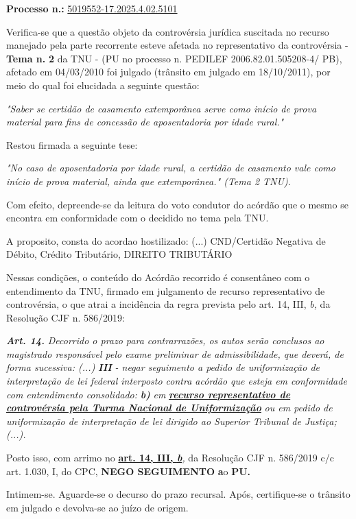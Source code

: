 \documentclass[12pt]{article}
\begin{document}
\justifying
\noindent \textbf{Processo n.: }\uline{5019552-17.2025.4.02.5101}

\noindent Verifica-se que a questão objeto da controvérsia jurídica suscitada no recurso manejado pela parte recorrente esteve afetada no representativo da controvérsia - \textbf{Tema n. }\textbf{2} da TNU - (PU no processo n. PEDILEF 2006.82.01.505208-4/ PB),  afetado em 04/03/2010 foi julgado (trânsito em julgado em 18/10/2011), por meio do qual foi elucidada a seguinte questão:

{\leftskip=3.1cm\rightskip=0.8cm\parindent=0pt \textit{"Saber se certidão de casamento extemporânea serve como início de prova material para fins de concessão de aposentadoria por idade rural."}\par}

\noindent Restou firmada a seguinte tese:

{\leftskip=3.1cm\rightskip=0.8cm\parindent=0pt \textit{"No caso de aposentadoria por idade rural, a certidão de casamento vale como início de prova material, ainda que extemporânea." (Tema 2 TNU).}\par}

\noindent Com efeito, depreende-se da leitura do voto condutor do acórdão que o mesmo se encontra em conformidade com o decidido no  tema pela TNU.

\noindent A proposito, consta do acordao hostilizado: (...) CND/Certidão Negativa de Débito, Crédito Tributário, DIREITO TRIBUTÁRIO

\noindent Nessas condições, o conteúdo do Acórdão recorrido é consentâneo com o entendimento da TNU, firmado em julgamento de recurso representativo de controvérsia, o que atrai a incidência da regra prevista pelo art. 14, III, \textit{b,} da Resolução CJF n. 586/2019:

\noindent \textit{\textbf{Art. 14.}}\textit{ Decorrido o prazo para contrarrazões, os autos serão conclusos ao magistrado responsável pelo exame preliminar de admissibilidade, que deverá, de forma sucessiva: (...) }\textit{\textbf{III }}\textit{- negar seguimento a pedido de uniformização de interpretação de lei federal interposto contra acórdão que esteja em conformidade com entendimento consolidado: }\textit{\textbf{b)}}\textit{ em }\textit{\textbf{\uline{recurso representativo de controvérsia pela Turma Nacional de Uniformização}}}\textit{ ou em pedido de uniformização de interpretação de lei dirigido ao Superior Tribunal de Justiça;(...).}

\noindent Posto isso, com arrimo no \textbf{\uline{art. 14, III, }}\textit{\textbf{\uline{b}}}\textit{,} da Resolução CJF n. 586/2019 c/c art. 1.030, I, do CPC, \textbf{NEGO SEGUIMENTO }\textbf{a}o\textbf{ PU}\textbf{.}

\noindent Intimem-se. Aguarde-se o decurso do prazo recursal. Após, certifique-se o trânsito em julgado e devolva-se ao juízo de origem.
\end{document}
